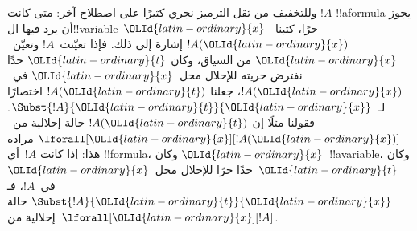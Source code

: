 \documentclass[../../../include/open-logic-section]{subfiles}
\begin{document}
وللتخفيف من ثقل الترميز نجري كثيرًا على اصطلاح آخر: متى كانت
$!A$ !!a{formula} يجوز أن يرد فيها ال!!{variable}~${\OLId{latin-ordinary}{x}}$ حرًا،
كتبنا~$!A({\OLId{latin-ordinary}{x}})$ إشارة إلى ذلك. فإذا تعيّنت~$!A$ وتعيّن~${\OLId{latin-ordinary}{x}}$ من السياق،
وكان ${\OLId{latin-ordinary}{t}}$ حدًا نفترض حريته للإحلال محل~${\OLId{latin-ordinary}{x}}$ في~$!A({\OLId{latin-ordinary}{x}})$، جعلنا
$!A({\OLId{latin-ordinary}{t}})$ اختصارًا لـ~$\Subst{!A}{{\OLId{latin-ordinary}{t}}}{{\OLId{latin-ordinary}{x}}}$. فقولنا مثلًا إن
$!A({\OLId{latin-ordinary}{t}})$ حالة إحلالية من~$\lforall[{\OLId{latin-ordinary}{x}}][!A({\OLId{latin-ordinary}{x}})]$ مراده هذا:
إذا كانت $!A$~أي !!{formula}، وكان ${\OLId{latin-ordinary}{x}}$~!!a{variable}، وكان ${\OLId{latin-ordinary}{t}}$~حدًا
حرًا للإحلال محل~${\OLId{latin-ordinary}{x}}$ في~$!A$، فـ$\Subst{!A}{{\OLId{latin-ordinary}{t}}}{{\OLId{latin-ordinary}{x}}}$ حالة إحلالية
من~$\lforall[{\OLId{latin-ordinary}{x}}][!A]$.
\end{document}

